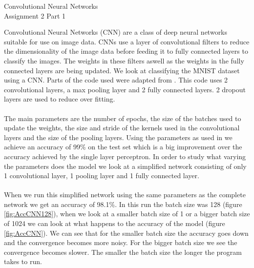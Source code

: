 \documentclass[10 pt, a4paper]{article}
\begin{document}
\begin{center}
\huge Convolutional Neural Networks \\
\Large Assignment 2 Part 1
\end{center}

Convolutional Neural Networks (CNN) are a class of deep neural networks suitable for use on image data. CNNs use a layer of convolutional filters to reduce the dimensionality of the image data before feeding it to fully connected layers to classify the images. The weights in these filters aswell as the weights in the fully connected layers are being updated. We look at classifying the MNIST dataset using a CNN. Parts of the code used were adapted from \cite{CNN}. This code uses 2 convolutional layers, a max pooling layer and 2 fully connected layers. 2 dropout layers are used to reduce over fitting.
\\
\\
The main parameters are the number of epochs, the size of the batches used to update the weights, the size and stride of the kernels used in the convolutional layers and the size of the pooling layers. Using the parameters as used in \cite{CNN} we achieve an accuracy of 99\% on the test set which is a big improvement over the accuracy achieved by the single layer perceptron. In order to study what varying the parameters does the model we look at a simplified network consisting of only 1 convolutional layer, 1 pooling layer and 1 fully connected layer.
\\
\\
When we run this simplified network using the same parameters as the complete network we get an accuracy of 98.1\%. In this run the batch size was 128 (figure \ref{fig:AccCNN128}), when we look at a smaller batch size of 1 or a bigger batch size of 1024 we can look at what happens to the accuracy of the model (figure \ref{fig:AccCNN}). We can see that for the smaller batch size the accuracy goes down and the convergence becomes more noisy. For the bigger batch size we see the convergence becomes slower. The smaller the batch size the longer the program takes to run.
\end{document}
